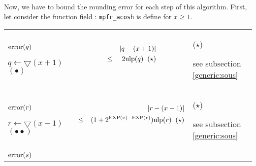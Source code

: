 \documentclass[12pt]{amsart}
\def\minf{\bigtriangledown}
\def\ulp{{\rm ulp}}
\def\Exp{{\rm EXP}}
\begin{document}
Now, we have to bound the rounding error for each step of this
algorithm. First, let consider the function field : {\tt mpfr\_acosh} is define for $x \geq 1$.

\begin{center}
\begin{tabular}{l l l}

\begin{minipage}{2.5cm}
${\textnormal{error}}(q)$


$q \leftarrow \minf(x+1) $
$(\bullet)$
\end{minipage} &
\begin{minipage}{7.5cm}



\begin{eqnarray}\nonumber
  &&|q-(x+1)| \\\nonumber
  &       \leq&  2 \ulp(q)\;\;(\star)\\\nonumber
\end{eqnarray}


\end{minipage} &
\begin{minipage}{6cm}

($\star$)

see subsection \ref{generic:sous}


\end{minipage}\\%
\begin{minipage}{2.5cm}
${\textnormal{error}}(r)$


$r \leftarrow \minf(x-1) $
$(\bullet\bullet)$
\end{minipage} &
\begin{minipage}{7.5cm}



\begin{eqnarray}\nonumber
  &&|r-(x-1)| \\\nonumber
  &       \leq&  (1+2^{\Exp(x)-\Exp(r)}) \ulp(r)\;\;(\star)\\\nonumber
\end{eqnarray}


\end{minipage} &
\begin{minipage}{6cm}

($\star$)

see subsection \ref{generic:sous}


\end{minipage}\\%
\begin{minipage}{2.5cm}
${\textnormal{error}}(s)$



\end{minipage}
\end{tabular}
\end{center}
\end{document}
